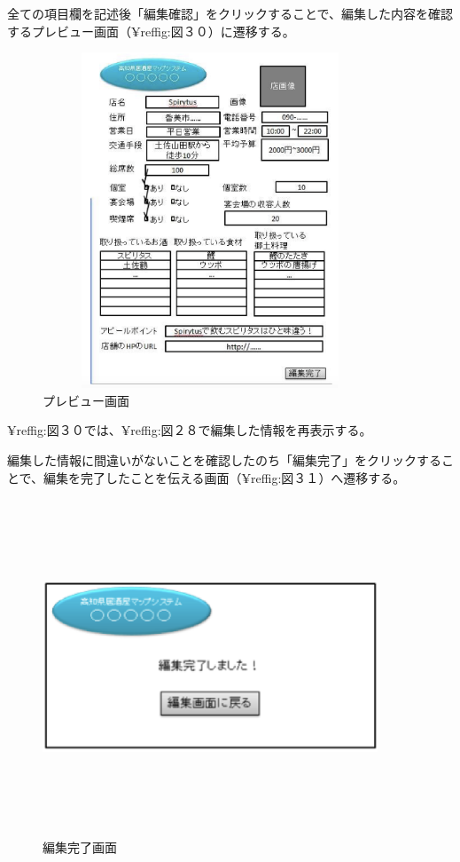 \documentclass[a4j,titlepage]{jarticle}
\begin{document}
全ての項目欄を記述後「編集確認」をクリックすることで、編集した内容を確認するプレビュー画面（¥ref{fig:図３０}）に遷移する。



\begin {figure}[!htbp]
    \begin{center}
    \includegraphics [height=10cm, width=10cm]{30.eps}
    \caption {プレビュー画面}
    \label {fig:30}
    \end{center}
\end {figure}


\clearpage
¥ref{fig:図３０}では、¥ref{fig:図２８}で編集した情報を再表示する。



編集した情報に間違いがないことを確認したのち「編集完了」をクリックすることで、編集を完了したことを伝える画面（¥ref{fig:図３１}）へ遷移する。



\begin {figure}[!htbp]
    \begin{center}
    \includegraphics [height=10cm, width=10cm]{31.eps}
    \caption {編集完了画面}
    \label {fig:31}
    \end{center}
\end {figure}
\end{document}
